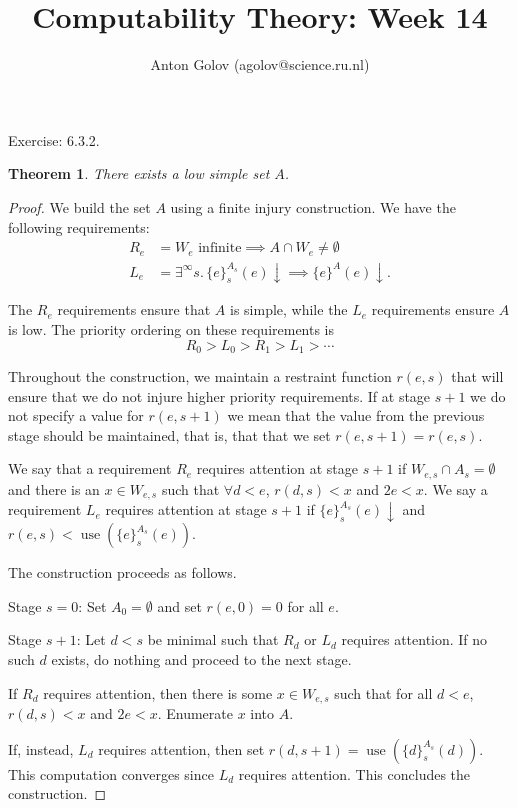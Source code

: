 \documentclass{article}
\title{Computability Theory: Week 14}
\author{Anton Golov (agolov@science.ru.nl)}
\newtheorem{theorem}{Theorem}
\newcommand{\set}[1]{\{ #1 \}}
\newcommand{\terminates}{\!\!\downarrow}
\DeclareMathOperator{\use}{use}
\begin{document}
  \maketitle

  Exercise: 6.3.2.

  \begin{theorem}
    There exists a low simple set $A$.
  \end{theorem}

  \begin{proof}
    We build the set $A$ using a finite injury construction.  We have the following requirements:
    \begin{align*}
      R_e &= \text{$W_e$ infinite} \implies A \cap W_e \neq \emptyset\\
      L_e &= \exists^\infty s.\, \set{e}^{A_s}_s(e)\terminates \implies \set{e}^A(e)\terminates.
    \end{align*}

    The $R_e$ requirements ensure that $A$ is simple, while the $L_e$ requirements ensure $A$ is low.  The priority
    ordering on these requirements is
    \[
      R_0 > L_0 > R_1 > L_1 > \cdots
    \]

    Throughout the construction, we maintain a restraint function $r(e, s)$ that will ensure that we do not injure
    higher priority requirements.  If at stage $s+1$ we do not specify a value for $r(e, s+1)$ we mean that the value
    from the previous stage should be maintained, that is, that that we set $r(e, s+1) = r(e,s)$.

    We say that a requirement $R_e$ requires attention at stage $s+1$ if $W_{e,s} \cap A_s = \emptyset$ and there is an
    $x \in W_{e,s}$ such that $\forall d < e$, $r(d, s) < x$ and $2e < x$.  We say a requirement $L_e$ requires
    attention at stage $s+1$ if $\set{e}^{A_s}_s(e)\terminates$ and $r(e, s) < \use(\set{e}^{A_s}_s(e))$.

    The construction proceeds as follows.

    Stage $s = 0$: Set $A_0 = \emptyset$ and set $r(e, 0) = 0$ for all $e$.

    Stage $s+1$: Let $d < s$ be minimal such that $R_d$ or $L_d$ requires attention.  If no such $d$ exists, do nothing
    and proceed to the next stage.

    If $R_d$ requires attention, then there is some $x \in W_{e,s}$ such that for all $d < e$, $r(d, s) < x$ and $2e <
    x$.  Enumerate $x$ into $A$.

    If, instead, $L_d$ requires attention, then set $r(d, s+1) = \use(\set{d}^{A_s}_s(d))$.  This computation converges
    since $L_d$ requires attention.  This concludes the construction.


\end{proof}
\end{document}
